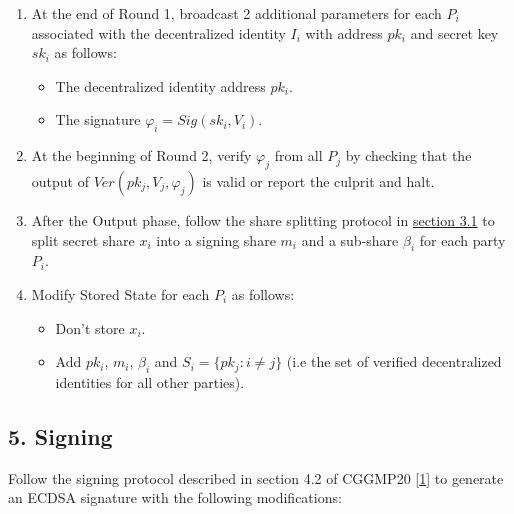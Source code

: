 \documentclass[
]{article}
\providecommand{\tightlist}{%
  \setlength{\itemsep}{0pt}\setlength{\parskip}{0pt}}
\begin{document}
\begin{enumerate}
\def\labelenumi{\arabic{enumi}.}
\tightlist
\item
  At the end of Round 1, broadcast 2 additional parameters for each
  \(P_i\) associated with the decentralized identity \(I_i\) with
  address \(pk_i\) and secret key \(sk_i\) as follows:

  \begin{itemize}
  \tightlist
  \item
    The decentralized identity address \(pk_i\).
  \item
    The signature \(\varphi _i = Sig(sk_i, V_i)\).
  \end{itemize}
\item
  At the beginning of Round 2, verify \(\varphi _j\) from all \(P_j\) by
  checking that the output of \(Ver(pk_j, V_j, \varphi _j)\) is valid or
  report the culprit and halt.
\item
  After the Output phase, follow the share splitting protocol in
  \protect\hyperlink{share-splitting}{section 3.1} to split secret share
  \(x_i\) into a signing share \(m_i\) and a sub-share \(\beta _i\) for
  each party \(P_i\).
\item
  Modify Stored State for each \(P_i\) as follows:

  \begin{itemize}
  \tightlist
  \item
    Don't store \(x_i\).
  \item
    Add \(pk_i\), \(m_i\), \(\beta _i\) and
    \(S_i = \{ pk_j : i \neq j \}\) (i.e the set of verified
    decentralized identities for all other parties).
  \end{itemize}
\end{enumerate}

\hypertarget{signing}{%
\subsection{5. Signing}\label{signing}}

Follow the signing protocol described in section 4.2 of CGGMP20
{[}\protect\hyperlink{ref-cggmp20}{1}{]} to generate an ECDSA signature
with the following modifications:
\end{document}
